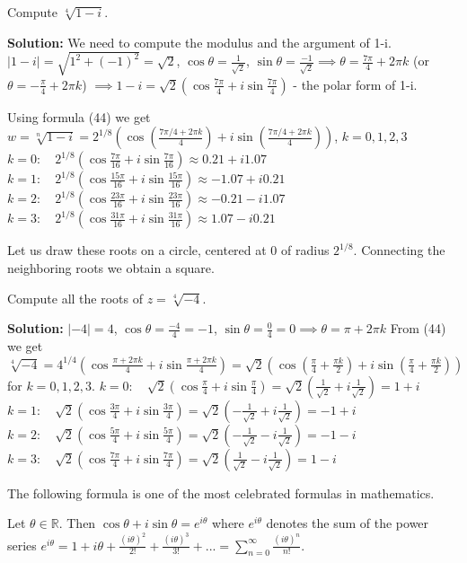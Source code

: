 \documentclass[12pt]{article}
\begin{document}
\begin{example}
Compute $\sqrt[4]{1-i}$.

\textbf{Solution:} We need to compute the modulus and the argument of 1-i.
$|1-i| = \sqrt{1^2+(-1)^2} = \sqrt{2}$, $\cos\theta = \frac{1}{\sqrt{2}}$, $\sin\theta = \frac{-1}{\sqrt{2}} \implies \theta = \frac{7\pi}{4} + 2\pi k$ (or $\theta = -\frac{\pi}{4} + 2\pi k$)
$\implies 1-i = \sqrt{2}(\cos\frac{7\pi}{4} + i\sin\frac{7\pi}{4})$ - the polar form of 1-i.

Using formula (44) we get
$w = \sqrt[n]{1-i} = 2^{1/8}(\cos(\frac{7\pi/4 + 2\pi k}{4}) + i\sin(\frac{7\pi/4 + 2\pi k}{4}))$, $k=0,1,2,3$
$k=0: \quad 2^{1/8}(\cos\frac{7\pi}{16} + i\sin\frac{7\pi}{16}) \approx 0.21 + i1.07$
$k=1: \quad 2^{1/8}(\cos\frac{15\pi}{16} + i\sin\frac{15\pi}{16}) \approx -1.07 + i0.21$
$k=2: \quad 2^{1/8}(\cos\frac{23\pi}{16} + i\sin\frac{23\pi}{16}) \approx -0.21 - i1.07$
$k=3: \quad 2^{1/8}(\cos\frac{31\pi}{16} + i\sin\frac{31\pi}{16}) \approx 1.07 - i0.21$

Let us draw these roots on a circle, centered at 0 of radius $2^{1/8}$. Connecting the neighboring roots we obtain a square.
\end{example}

\begin{example}
Compute all the roots of $z = \sqrt[4]{-4}$.

\textbf{Solution:} $|-4| = 4$, $\cos\theta = \frac{-4}{4} = -1$, $\sin\theta = \frac{0}{4} = 0 \implies \theta = \pi + 2\pi k$
From (44) we get
$\sqrt[4]{-4} = 4^{1/4}(\cos\frac{\pi + 2\pi k}{4} + i\sin\frac{\pi + 2\pi k}{4}) = \sqrt{2}(\cos(\frac{\pi}{4} + \frac{\pi k}{2}) + i\sin(\frac{\pi}{4} + \frac{\pi k}{2}))$ for $k=0,1,2,3$.
$k=0: \quad \sqrt{2}(\cos\frac{\pi}{4} + i\sin\frac{\pi}{4}) = \sqrt{2}(\frac{1}{\sqrt{2}} + i\frac{1}{\sqrt{2}}) = 1+i$
$k=1: \quad \sqrt{2}(\cos\frac{3\pi}{4} + i\sin\frac{3\pi}{4}) = \sqrt{2}(-\frac{1}{\sqrt{2}} + i\frac{1}{\sqrt{2}}) = -1+i$
$k=2: \quad \sqrt{2}(\cos\frac{5\pi}{4} + i\sin\frac{5\pi}{4}) = \sqrt{2}(-\frac{1}{\sqrt{2}} - i\frac{1}{\sqrt{2}}) = -1-i$
$k=3: \quad \sqrt{2}(\cos\frac{7\pi}{4} + i\sin\frac{7\pi}{4}) = \sqrt{2}(\frac{1}{\sqrt{2}} - i\frac{1}{\sqrt{2}}) = 1-i$
\end{example}

The following formula is one of the most celebrated formulas in mathematics.

\begin{theorem}
Let $\theta \in \mathbb{R}$. Then $\cos\theta + i\sin\theta = e^{i\theta}$ where $e^{i\theta}$ denotes the sum of the power series $e^{i\theta} = 1 + i\theta + \frac{(i\theta)^2}{2!} + \frac{(i\theta)^3}{3!} + ... = \sum_{n=0}^{\infty}\frac{(i\theta)^n}{n!}$.
\end{theorem}
\end{document}
